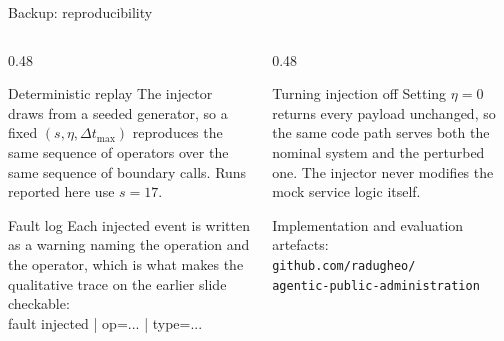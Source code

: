 \documentclass[aspectratio=169,10pt]{beamer}
\newcommand{\cmt}[1]{{\color{stone}\small #1}}          %
\begin{document}
\begin{frame}[noframenumbering]{Backup: reproducibility}
  \begin{columns}[T]
    \begin{column}{0.48\textwidth}
      \begin{block}{Deterministic replay}
        \small The injector draws from a seeded generator, so a fixed $(s, \eta,
        \Delta t_{\max})$ reproduces the same sequence of operators over the same sequence of
        boundary calls. Runs reported here use $s = 17$.
      \end{block}
      \begin{block}{Fault log}
        \small Each injected event is written as a warning naming the operation and the
        operator, which is what makes the qualitative trace on the earlier slide checkable:\\[0.3em]
        {\scriptsize\ttfamily [WARN] fault injected | op=... | type=...}
      \end{block}
    \end{column}
    \begin{column}{0.48\textwidth}
      \begin{block}{Turning injection off}
        \small Setting $\eta = 0$ returns every payload unchanged, so the same code path serves
        both the nominal system and the perturbed one. The injector never modifies the mock
        service logic itself.
      \end{block}
      \medskip
      \cmt{Implementation and evaluation artefacts:}\\[0.3em]
      \texttt{\small github.com/radugheo/\\agentic-public-administration}
    \end{column}
  \end{columns}
\end{frame}
\end{document}
